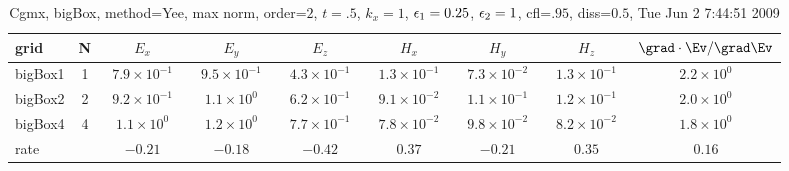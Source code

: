 \begin{table}[hbt]\tableFont %
\begin{center}
\begin{tabular}{|l|c|c|c|c|c|c|c|c|} \hline 
grid  & N &  $E_x$ &  $E_y$ & $E_z$ &  $H_x$ &  $H_y$ & $H_z$ & $\grad\cdot\Ev/\grad\Ev$\\ \hline 
             bigBox1 &     1 & ~$7.9\times10^{ -1}$~ & ~$9.5\times10^{ -1}$~ & ~$4.3\times10^{ -1}$~ & ~$1.3\times10^{ -1}$~ & ~$7.3\times10^{ -2}$~ & ~$1.3\times10^{ -1}$~ & ~$2.2\times10^{  0}$~  \\ \hline
             bigBox2 &     2 & ~$9.2\times10^{ -1}$~ & ~$1.1\times10^{  0}$~ & ~$6.2\times10^{ -1}$~ & ~$9.1\times10^{ -2}$~ & ~$1.1\times10^{ -1}$~ & ~$1.2\times10^{ -1}$~ & ~$2.0\times10^{  0}$~  \\ \hline
             bigBox4 &     4 & ~$1.1\times10^{  0}$~ & ~$1.2\times10^{  0}$~ & ~$7.7\times10^{ -1}$~ & ~$7.8\times10^{ -2}$~ & ~$9.8\times10^{ -2}$~ & ~$8.2\times10^{ -2}$~ & ~$1.8\times10^{  0}$~  \\ \hline
    rate             &       &       $-0.21$          &       $-0.18$          &       $-0.42$          &       $0.37$          &       $-0.21$          &       $0.35$          &       $0.16$           \\ \hline
\end{tabular}
\caption{Cgmx, bigBox, method=Yee, max norm, order=$2$, $t=.5$, $k_x=1$, $\epsilon_1=0.25$, $\epsilon_2=1$, cfl=$.95$, diss=$0.5$, Tue Jun  2  7:44:51 2009}\label{table:dielectricSphereYeeOrder2max}
\end{center}
\end{table}


